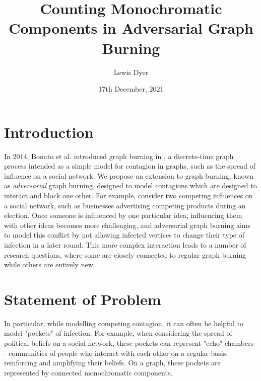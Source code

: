 \documentclass{mprop}
\begin{document}
\title{Counting Monochromatic Components in Adversarial Graph Burning}
\author{Lewis Dyer}
\date{17th December, 2021}
\maketitle

\tableofcontents
\newpage

\section{Introduction}\label{intro}

In 2014, Bonato et al. introduced graph burning in \cite{bonato_burning_2014}, a discrete-time graph process intended as a simple model for contagion in graphs, such as the spread of influence on a social network. We propose an extension to graph burning, known as \emph{adversarial} graph burning, designed to model contagions which are designed to interact and block one other. For example, consider two competing influences on a social network, such as businesses advertising competing products during an election. Once someone is influenced by one particular idea, influencing them with other ideas becomes more challenging, and adversarial graph burning aims to model this conflict by not allowing infected vertices to change their type of infection in a later round. This more complex interaction leads to a number of research questions, where some are closely connected to regular graph burning while others are entirely new.

\section{Statement of Problem}

In particular, while modelling competing contagion, it can often be helpful to model "pockets" of infection. For example, when considering the spread of political beliefs on a social network, these pockets can represent "echo" chambers - communities of people who interact with each other on a regular basis, reinforcing and amplifying their beliefs. On a graph, these pockets are represented by connected monochromatic components.
\end{document}
